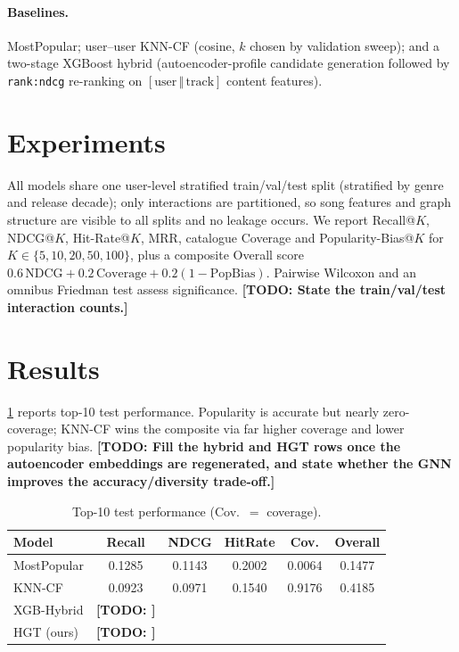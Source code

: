 \documentclass[10pt,twocolumn,letterpaper]{article}
\newcommand{\TODO}[1]{\textbf{\color{red}[TODO: #1]}}
\begin{document}
\paragraph{Baselines.}
MostPopular; user--user KNN-CF (cosine, $k$ chosen by validation sweep); and a
two-stage XGBoost hybrid (autoencoder-profile candidate generation followed by
\texttt{rank:ndcg} re-ranking on $[\text{user}\,\Vert\,\text{track}]$ content
features).

\section{Experiments}

All models share one user-level stratified train/val/test split (stratified by
genre and release decade); only interactions are partitioned, so song features
and graph structure are visible to all splits and no leakage occurs. We report
Recall@$K$, NDCG@$K$, Hit-Rate@$K$, MRR, catalogue Coverage and
Popularity-Bias@$K$ for $K\in\{5,10,20,50,100\}$, plus a composite Overall
score $0.6\,\mathrm{NDCG}+0.2\,\mathrm{Coverage}+0.2(1-\mathrm{PopBias})$.
Pairwise Wilcoxon and an omnibus Friedman test assess significance.
\TODO{State the train/val/test interaction counts.}

\section{Results}

\cref{tab:m2} reports top-10 test performance. Popularity is accurate but
nearly zero-coverage; KNN-CF wins the composite via far higher coverage and
lower popularity bias. \TODO{Fill the hybrid and HGT rows once the autoencoder
embeddings are regenerated, and state whether the GNN improves the
accuracy/diversity trade-off.}

\begin{table}[t]
\centering\footnotesize
\caption{Top-10 test performance (Cov.\ $=$ coverage).}
\label{tab:m2}
\begin{tabular}{lccccc}
\toprule
\textbf{Model} & Recall & NDCG & HitRate & Cov. & Overall \\
\midrule
MostPopular   & 0.1285 & 0.1143 & 0.2002 & 0.0064 & 0.1477 \\
KNN-CF        & 0.0923 & 0.0971 & 0.1540 & 0.9176 & 0.4185 \\
XGB-Hybrid    & \TODO{} & & & & \\
HGT (ours)    & \TODO{} & & & & \\
\bottomrule
\end{tabular}
\end{table}
\end{document}

